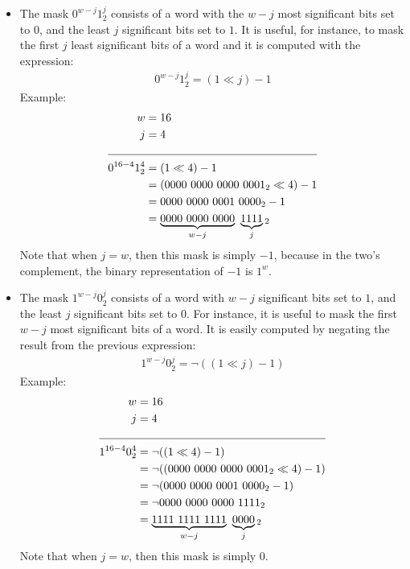 \begin{itemize}
    \item
    The mask $0^{w-j} 1^j_2$ consists of a word with the $w-j$ most significant bits set to $0$, and the least $j$ significant bits set to $1$. It is useful, for instance, to mask the first $j$ least significant bits of a word and it is computed with the expression:
    \begin{align*}
        0^{w-j} 1^j_2 = (1 \ll j) - 1
    \end{align*}
    Example:
    \begin{align*}
        w &= 16\\
        j &= 4\\
        \cline{1-2}
        0^{16-4} 1^4_2 &= (1 \ll 4) - 1\\
        &= (0000\ 0000\ 0000\ 0001_2 \ll 4) - 1\\
        &= 0000\ 0000\ 0001\ 0000_2 - 1\\
        &= \underbrace{0000\ 0000\ 0000}_{w-j}\ \underbrace{1111}_{j}{}_2
    \end{align*}
    Note that when $j = w$, then this mask is simply $-1$, because in the two's complement, the binary representation of $-1$ is $1^w$.
    
    \item
    The mask $1^{w-j} 0^j_2$ consists of a word with $w-j$ significant bits set to $1$, and the least $j$ significant bits set to $0$. For instance, it is useful to mask the first $w - j$ most significant bits of a word. It is easily computed by negating the result from the previous expression:
    \begin{align*}
        1^{w-j} 0^j_2= \neg((1 \ll j) - 1)
    \end{align*}
    Example:
    \begin{align*}
        w &= 16\\
        j &= 4\\
        \cline{1-2}
        1^{16-4} 0^4_2 &= \neg((1 \ll 4) - 1)\\
        &= \neg((0000\ 0000\ 0000\ 0001_2 \ll 4) - 1)\\
        &= \neg(0000\ 0000\ 0001\ 0000_2 - 1)\\
        &= \neg0000\ 0000\ 0000\ 1111_2\\
        &= \underbrace{1111\ 1111\ 1111}_{w-j}\ \underbrace{0000}_{j}{}_2
    \end{align*}
    Note that when $j = w$, then this mask is simply $0$.
\end{itemize}

